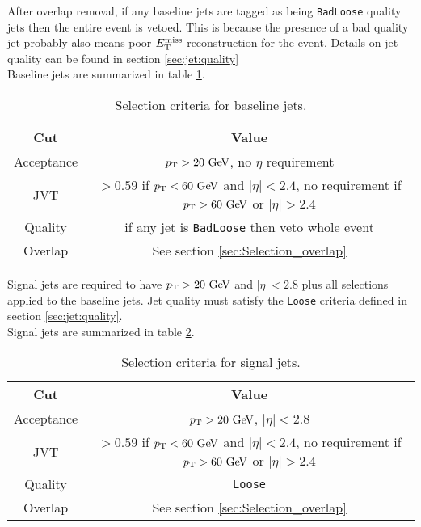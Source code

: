 \indent After overlap removal, if any baseline jets are tagged as being {\tt BadLoose} quality jets then the entire event is vetoed.  This is because the presence of a bad quality jet probably also means poor $E_{\mathrm{T}}^{\mathrm{miss}}$ reconstruction for the event.  Details on jet quality can be found in section \ref{sec:jet:quality} \\

\indent Baseline jets are summarized in table \ref{tb:jets:baseline}. \\

\begin{table}[htp]
  \caption{Selection criteria for baseline jets.} 
  \begin{center}
    \begin{tabular}{c|c} \hline \hline
      Cut & Value \\ \hline \hline
      Acceptance & $\pT > 20\gev$, no $\eta$ requirement \\ \hline
      JVT & $> 0.59$ if $\pt < 60 \gev$ and $|\eta| < 2.4$, no requirement if $\pt > 60 \gev$ or $|\eta| > 2.4$ \\ \hline
      Quality & if any jet is {\tt BadLoose} then veto whole event  \\ \hline
      Overlap & See section \ref{sec:Selection_overlap} \\ \hline
      \hline
    \end{tabular}
  \end{center}
  \label{tb:jets:baseline}
\end{table}%

\indent Signal jets are required to have $\pt > 20\gev$ and $|\eta|<2.8$ plus all selections applied to the baseline jets. Jet quality must satisfy the {\tt Loose} criteria defined in section \ref{sec:jet:quality}. \\

\indent Signal jets are summarized in table \ref{tb:jets:signal}. \\

\begin{table}[htp]
  \caption{Selection criteria for signal jets.} 
  \begin{center}
    \begin{tabular}{c|c} \hline \hline
      Cut & Value \\ \hline \hline
      Acceptance & $\pT > 20\gev$, $|\eta| < 2.8$ \\ \hline
      JVT & $> 0.59$ if $\pt < 60 \gev$ and $|\eta| < 2.4$, no requirement if $\pt > 60 \gev$ or $|\eta| > 2.4$ \\ \hline
      Quality & {\tt Loose} \\ \hline
      Overlap & See section \ref{sec:Selection_overlap} \\ \hline
      \hline
    \end{tabular}
  \end{center}
  \label{tb:jets:signal}
\end{table}%

